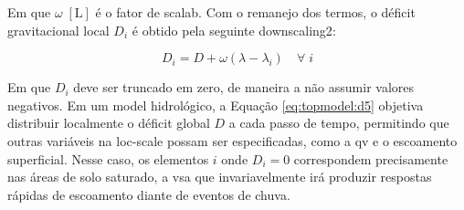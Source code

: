 \documentclass[./main.tex]{subfiles}
\begin{document}
Em que $\omega \; [\text{L}]$ é o fator de \gls{scalab}. Com o remanejo dos termos, o déficit gravitacional local $D_{i}$ é obtido pela seguinte \gls{downscaling2}:
\begin{linenomath*}
\begin{equation}
\label{eq:topmodel:d5}
D_{i}  = D + \omega (\lambda - \lambda_{i}) \quad \forall \; i
\end{equation}
\end{linenomath*}
Em que $D_i$ deve ser truncado em zero, de maneira a não assumir valores negativos. Em um \gls{model} hidrológico, a Equação \eqref{eq:topmodel:d5} objetiva distribuir localmente o déficit global $D$ a cada passo de tempo, permitindo que outras variáveis na \gls{loc-scale} possam ser especificadas, como a \gls{qv} e o escoamento superficial. Nesse caso, os elementos $i$ onde $D_i = 0$ correspondem precisamente nas áreas de solo saturado, a \gls{vsa} que invariavelmente irá produzir respostas rápidas de escoamento diante de eventos de chuva. 
\end{document}
